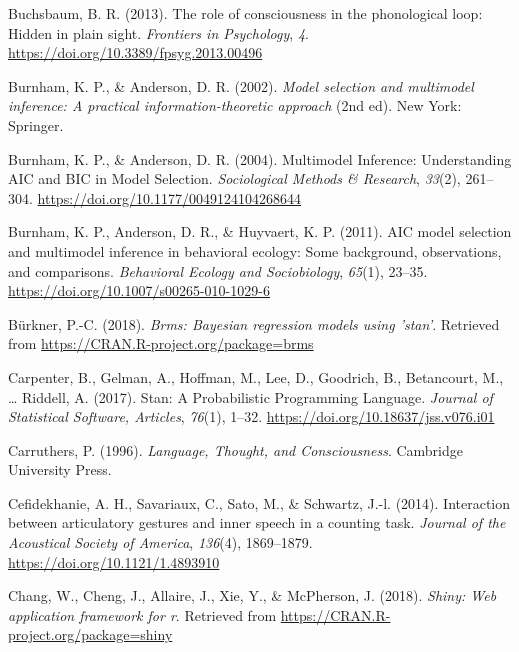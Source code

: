 \documentclass[a4paper,12pt,twoside,openright,oldfontcommands]{memoir}
\begin{document}
\leavevmode\hypertarget{ref-buchsbaum_role_2013}{}%
Buchsbaum, B. R. (2013). The role of consciousness in the phonological loop: Hidden in plain sight. \emph{Frontiers in Psychology}, \emph{4}. \url{https://doi.org/10.3389/fpsyg.2013.00496}

\leavevmode\hypertarget{ref-burnham_model_2002}{}%
Burnham, K. P., \& Anderson, D. R. (2002). \emph{Model selection and multimodel inference: A practical information-theoretic approach} (2nd ed). New York: Springer.

\leavevmode\hypertarget{ref-burnham_multimodel_2004}{}%
Burnham, K. P., \& Anderson, D. R. (2004). Multimodel Inference: Understanding AIC and BIC in Model Selection. \emph{Sociological Methods \& Research}, \emph{33}(2), 261--304. \url{https://doi.org/10.1177/0049124104268644}

\leavevmode\hypertarget{ref-burnham_aic_2011}{}%
Burnham, K. P., Anderson, D. R., \& Huyvaert, K. P. (2011). AIC model selection and multimodel inference in behavioral ecology: Some background, observations, and comparisons. \emph{Behavioral Ecology and Sociobiology}, \emph{65}(1), 23--35. \url{https://doi.org/10.1007/s00265-010-1029-6}

\leavevmode\hypertarget{ref-R-brms}{}%
Bürkner, P.-C. (2018). \emph{Brms: Bayesian regression models using 'stan'}. Retrieved from \url{https://CRAN.R-project.org/package=brms}

\leavevmode\hypertarget{ref-carpenter_stan:_2017}{}%
Carpenter, B., Gelman, A., Hoffman, M., Lee, D., Goodrich, B., Betancourt, M., \ldots{} Riddell, A. (2017). Stan: A Probabilistic Programming Language. \emph{Journal of Statistical Software, Articles}, \emph{76}(1), 1--32. \url{https://doi.org/10.18637/jss.v076.i01}

\leavevmode\hypertarget{ref-carruthers_language_1996}{}%
Carruthers, P. (1996). \emph{Language, Thought, and Consciousness}. Cambridge University Press.

\leavevmode\hypertarget{ref-cefidekhanie_interaction_2014}{}%
Cefidekhanie, A. H., Savariaux, C., Sato, M., \& Schwartz, J.-l. (2014). Interaction between articulatory gestures and inner speech in a counting task. \emph{Journal of the Acoustical Society of America}, \emph{136}(4), 1869--1879. \url{https://doi.org/10.1121/1.4893910}

\leavevmode\hypertarget{ref-R-shiny}{}%
Chang, W., Cheng, J., Allaire, J., Xie, Y., \& McPherson, J. (2018). \emph{Shiny: Web application framework for r}. Retrieved from \url{https://CRAN.R-project.org/package=shiny}
\end{document}

